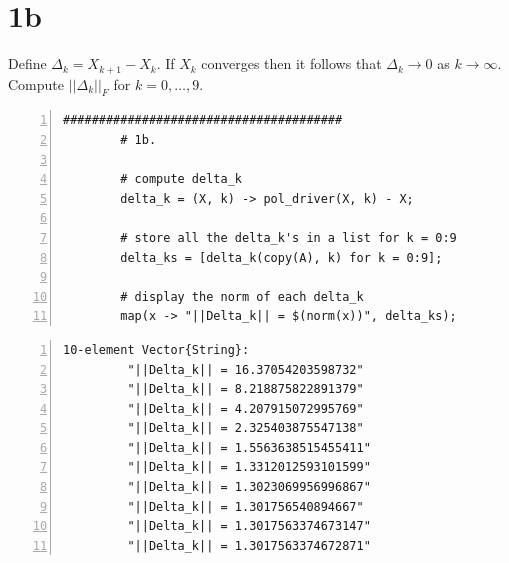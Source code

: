 \documentclass{article}
\begin{document}
    \newpage

    \section*{1b}
    Define $\Delta_k = X_{k+1} - X_k$. If $X_k$ converges then it follows that $\Delta_k \to 0$ as $k \to \infty$. Compute $||\Delta_k||_F$ for $k = 0, \ldots, 9$.
    \vspace{3em}
    \begin{Verbatim}[frame=single, label=Find and print Delta k, numbers=left, fontsize=\small, xleftmargin=-.5cm, xrightmargin=-.5cm, framesep=3mm]
        #######################################
        # 1b.

        # compute delta_k 
        delta_k = (X, k) -> pol_driver(X, k) - X;
                                 
        # store all the delta_k's in a list for k = 0:9
        delta_ks = [delta_k(copy(A), k) for k = 0:9];
       
        # display the norm of each delta_k
        map(x -> "||Delta_k|| = $(norm(x))", delta_ks);

    \end{Verbatim}

    \vspace{1em}

    \begin{Verbatim}[frame=single, label=Julia REPL for Delta k, numbers=left, fontsize=\small, xleftmargin=-.5cm, xrightmargin=-.5cm, framesep=3mm]
        10-element Vector{String}:
         "||Delta_k|| = 16.37054203598732"
         "||Delta_k|| = 8.218875822891379"
         "||Delta_k|| = 4.207915072995769"
         "||Delta_k|| = 2.325403875547138"
         "||Delta_k|| = 1.5563638515455411"
         "||Delta_k|| = 1.3312012593101599"
         "||Delta_k|| = 1.3023069956996867"
         "||Delta_k|| = 1.301756540894667"
         "||Delta_k|| = 1.3017563374673147"
         "||Delta_k|| = 1.3017563374672871"
    \end{Verbatim}

    \newpage
\end{document}
